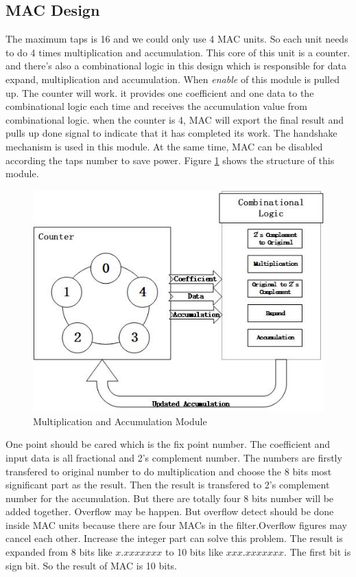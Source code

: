 \documentclass[a4paper]{article}
\begin{document}
\subsection{MAC Design}\label{subsec1_1}
The maximum taps is 16 and we could only use 4 MAC units. So each unit needs to do 4 times multiplication and accumulation. This core of this unit is a counter. and there's also a combinational logic in this design which is responsible for data expand, multiplication and accumulation. When \emph{enable} of this module is pulled up. The counter will work. it provides one coefficient and one data to the combinational logic each time and receives the accumulation value from combinational logic. when the counter is 4, MAC will export the final result and pulls up done signal to indicate that it has completed its work. The handshake mechanism is used in this module. At the same time, MAC can be disabled according the taps number to save power. Figure \ref{fig:MAC} shows the structure of this module. 
\begin{figure}[htb]
\centering
\includegraphics[scale=0.6]{pic/MAC_design}
\caption{Multiplication and Accumulation Module}
\label{fig:MAC}
\end{figure}

One point should be cared which is the fix point number. The coefficient and input data is all fractional and 2's complement number. The numbers are firstly transfered to original number to do multiplication and choose the 8 bits most significant part as the result. Then the result is transfered to 2's complement number for the accumulation. But there are totally four 8 bits number will be added together. Overflow may be happen. But overflow detect should be done inside MAC units because there are four MACs in the filter.Overflow figures may cancel each other. Increase the integer part can solve this problem. The result is expanded from 8 bits like $x.xxxxxxx$ to 10 bits like $xxx.xxxxxxx$. The first bit is sign bit. So the result of MAC is 10 bits.
\end{document}
